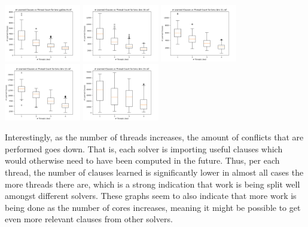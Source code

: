 \documentclass[11pt]{extarticle}
\begin{document}
\includegraphics[width=0.25\textwidth]{figures/bmc-galileo-9lnt.png}
\includegraphics[width=0.25\textwidth]{figures/bmc-ibm-10lnt.png}
\includegraphics[width=0.25\textwidth]{figures/bmc-ibm-11lnt.png}
\includegraphics[width=0.25\textwidth]{figures/bmc-ibm-12lnt.png}
\includegraphics[width=0.25\textwidth]{figures/bmc-ibm-13lnt.png}

Interestingly, as the number of threads increases, the amount of conflicts that are performed
goes down. That is, each solver is importing useful clauses which would otherwise need to have
been computed in the future. Thus, per each thread, the number of clauses learned is
significantly lower in almost all cases the more threads there are, which is a strong indication
that work is being split well amongst different solvers. These graphs seem to also indicate that
more work is being done as the number of cores increases, meaning it might be possible to get
even more relevant clauses from other solvers.


\nocite{*}

\end{document}
